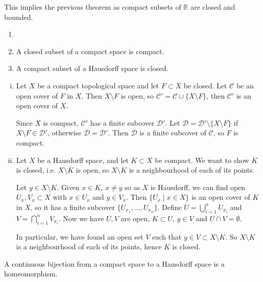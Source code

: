 \documentclass[12pt]{article}
\begin{document}
\begin{remark}
	This implies the previous theorem as compact subsets of $\mathbb{R}$ are closed and bounded.
\end{remark}

\begin{lemma}
	\begin{enumerate}[\normalfont(i)]
		\item[]
		\item A closed subset of a compact space is compact.
		\item A compact subset of a Hausdorff space is closed.
	\end{enumerate}
\end{lemma}

\begin{proofbox}
	\begin{enumerate}[(i)]
		\item Let $X$ be a compact topological space and let $F \subset X$ be closed. Let $\mathcal{C}$ be an open cover of $F$ in $X$. Then $X \setminus F$ is open, so $\mathcal{C}' = \mathcal{C} \cup \{X \setminus F\}$, then $\mathcal{C}'$ is an open cover of $X$.

			Since $X$ is compact, $\mathcal{C}'$ has a finite subcover $\mathcal{D}'$. Let $\mathcal{D} = \mathcal{D}' \setminus\{X \setminus F\}$ if $X \setminus F \in \mathcal{D}'$, otherwise $\mathcal{D} = \mathcal{D}'$. Then $\mathcal{D}$ is a finite subcover of $\mathcal{C}$, so $F$ is compact.
		\item Let $X$ be a Hausdorff space, and let $K \subset X$ be compact. We want to show $K$ is closed, i.e. $X \setminus K$ is open, so $X \setminus K$ is a neighbourhood of each of its points.

			Let $y \in X \setminus K$. Given $x \in K$, $x \neq y$ so as $X$ is Hausdorff, we can find open $U_x, V_x \subset X$ with $x \in U_x$ and $y \in V_x$. Then $\{U_x \mid x \in X\}$ is an open cover of $K$ in $X$, so it has a finite subcover $\{U_{x_1}, \ldots, U_{x_n}\}$. Define $U = \bigcup_{i = 1}^{n} U_{x_i}$ and $V = \bigcap_{i = 1}^{n} V_{x_i}$. Now we have $U, V$ are open, $K \subset U$, $y \in V$ and $U \cap V = \emptyset$.

			In particular, we have found an open set $V$ such that $y \in V \subset X \setminus K$. So $X \setminus K$ is a neighbourhood of each of its points, hence $K$ is closed.
	\end{enumerate}
\end{proofbox}

\begin{theorem}
	A continuous bijection from a compact space to a Hausdorff space is a homeomorphism.
\end{theorem}
\end{document}
